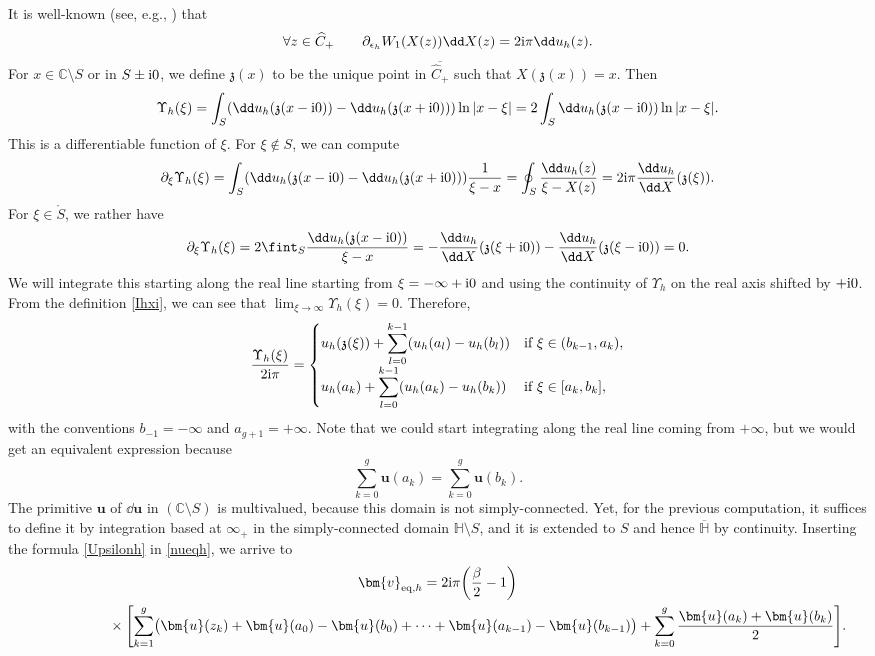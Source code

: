 \documentclass[pdftex]{sigma}
\numberwithin{equation}{section}
\begin{document}
It is well-known (see, e.g., \cite[Appendix A]{BGmulti}) that
\[
\forall z \in \widehat{C}_+\qquad \partial_{\epsilon_h} W_1(X(z))\dd X(z) = 2{\rm i}\pi \dd u_h(z).
\]
For $x \in \mathbb{C} \setminus S$ or in $S \pm {\rm i}0$, we define $\mathfrak{z}(x)$ to be the unique point in $\overline{\widehat{C}_+}$ such that $X(\mathfrak{z}(x)) = x$. Then
\[
\Upsilon_h(\xi) = \int_{S}  (\dd u_h(\mathfrak{z}(x - {\rm i}0)) - \dd u_h(\mathfrak{z}(x + {\rm i}0)) ) \ln|x - \xi| = 2\int_{S} \dd u_h(\mathfrak{z}(x - {\rm i}0)) \ln|x - \xi|.
\]
This is a differentiable function of $\xi$. For $\xi \notin S$, we can compute
\[
\partial_{\xi} \Upsilon_h(\xi) = \int_{S}  (\dd u_h(\mathfrak{z}(x - {\rm i}0) - \dd u_h(\mathfrak{z}(x + {\rm i}0)) ) \frac{1}{\xi - x} = \oint_{S} \frac{\dd u_h(z)}{\xi - X(z)} = 2{\rm i}\pi \frac{\dd u_h}{\dd X}(\mathfrak{z}(\xi)).
\]
For $\xi \in \mathring{S}$, we rather have
\[
\partial_{\xi} \Upsilon_h(\xi) = 2 \fint_{S} \frac{\dd u_h(\mathfrak{z}(x - {\rm i}0))}{\xi - x} = -\frac{\dd u_h}{\dd X}(\mathfrak{z}(\xi + {\rm i}0)) - \frac{\dd u_h}{\dd X}(\mathfrak{z}(\xi - {\rm i}0)) = 0.
\]
We will integrate this starting along the real line starting from $\xi = - \infty + {\rm i}0$ and using the continuity of $\Upsilon_h$ on the real axis shifted by $+{\rm i}0$. From the definition \eqref{Ihxi}, we can see that $\lim_{\xi \rightarrow \infty} \Upsilon_h(\xi) = 0$. Therefore,
\begin{equation}
\label{Upsilonh}
\frac{\Upsilon_h(\xi)}{2{\rm i}\pi} = \begin{cases}\displaystyle u_h(\mathfrak{z}(\xi)) + \sum_{l = 0}^{k - 1}  (u_h(a_l) - u_h(b_l) ) & \text{if} \ \xi \in (b_{k - 1},a_k), \\
\displaystyle u_h(a_k) + \sum_{l = 0}^{k- 1}  (u_h(a_k) - u_h(b_k) ) & \text{if} \ \xi \in [a_k,b_k], \end{cases}
\end{equation}
with the conventions $b_{-1} = -\infty$ and $a_{g + 1} = +\infty$. Note that we could start integrating along the real line coming from $+\infty$, but we would get an equivalent expression because
\begin{equation*}
\sum_{k = 0}^{g} \bm{u}(a_k) = \sum_{k = 0}^{g} \bm{u}(b_k).
\end{equation*}
The primitive $\bm{u}$ of $\dd \bm{u}$ in $(\mathbb{C} \setminus S)$ is multivalued, because this domain is not simply-connected. Yet, for the previous computation, it suffices to define it by integration based at $\infty_+$ in the simply-connected domain $\mathbb{H} \setminus S$, and it is extended to $S$ and hence $\overline{\mathbb{H}}$ by continuity. Inserting the formula \eqref{Upsilonh} in \eqref{nueqh}, we arrive to
\begin{gather}
\bm{v}_{{\rm eq},h} = 2{\rm i}\pi \biggl(\frac{\beta}{2} - 1\biggr)\label{sumv}\\
\hphantom{\bm{v}_{{\rm eq},h} =}{}
\times\Biggl[\sum_{k = 1}^{g} \bigl(\bm{u}(z_k) + \bm{u}(a_0) - \bm{u}(b_0) + \cdots + \bm{u}(a_{k - 1}) - \bm{u}(b_{k - 1})\bigr) + \sum_{k = 0}^g \frac{\bm{u}(a_k) + \bm{u}(b_k)}{2}\Biggr].\nonumber
\end{gather}
\end{document}
